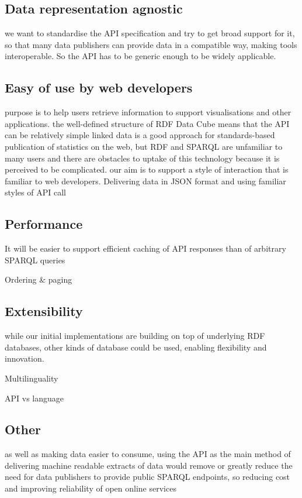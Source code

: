 \documentclass{llncs}
\begin{document}
\subsection{Data representation agnostic}
we want to standardise the API specification and try to get broad support for it, so that many data publishers can provide data in a compatible way, making tools interoperable.  So the API has to be generic enough to be widely applicable.


\subsection{Easy of use by web developers}
purpose is to help users retrieve information to support visualisations and other applications.
the well-defined structure of RDF Data Cube means that the API can be relatively simple
linked data is a good approach for standards-based publication of statistics on the web, but RDF and SPARQL are unfamiliar to many users and there are obstacles to uptake of this technology because it is perceived to be complicated. our aim is to support a style of interaction that is familiar to web developers. Delivering data in JSON format and using familiar styles of API call 


\subsection{Performance}
It will be easier to support efficient caching of API responses than of arbitrary SPARQL queries

Ordering \& paging


\subsection{Extensibility}
while our initial implementations are building on top of underlying RDF databases, other kinds of database could be used, enabling flexibility and innovation. 

Multilinguality

API vs language

\subsection{Other}


as well as making data easier to consume, using the API as the main method of delivering machine readable extracts of data would remove or greatly reduce the need for data publishers to provide public SPARQL endpoints, so reducing cost and improving reliability of open online services
\end{document}
